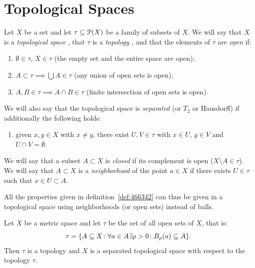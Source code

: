 \section{Topological Spaces}

\begin{definition}
Let $X$ be a set and let $\tau\subset \P(X)$ be a family of subsets of $X$.
We will say that $X$ is a \emph{topological space}%
, that $\tau$ is a
\emph{topology}%
, and that the elements of $\tau$ are \emph{open}%
if:
\begin{enumerate}
\item $\emptyset \in \tau$, $X\in \tau$ (the empty set and the entire space are open);
\item $A \subset \tau \implies \bigcup A \in \tau$ (any union of open sets is open);
\item $A,B\in \tau \implies A \cap B \in \tau$ (finite intersection of open sets is open).
\end{enumerate}
We will also say that the topological space is \emph{separated}%
 (or $T_2$ or Hausdorff)
if additionally the following holds:
\begin{enumerate}
\item[4.] given $x,y\in X$ with $x\neq y$, there exist $U,V\in \tau$ with $x\in U$,
$y\in V$ and $U\cap V=\emptyset$.
\end{enumerate}

We will say that a subset $A\subset X$ is \emph{closed}%
 if its complement
is open ($X\setminus A\in \tau$).
We will say that $A\subset X$ is a \emph{neighborhood}%
 of the point $a\in X$ if there exists $U\in \tau$
such that $x\in U \subset A$.

All the properties given in definition~\ref{def:466342} can thus be
given in a topological space using neighborhoods (or open sets) instead of
balls.
\end{definition}

\begin{theorem}
Let $X$ be a metric space and let $\tau$ be the set of all open sets
of $X$, that is:
\[
 \tau = \ENCLOSE{A \subset X\colon \forall a \in A \exists \rho>0 \colon B_\rho(a)\subset A}.
\]
Then $\tau$ is a topology and $X$ is a separated topological space with respect
to the topology
$\tau$.
\end{theorem}

